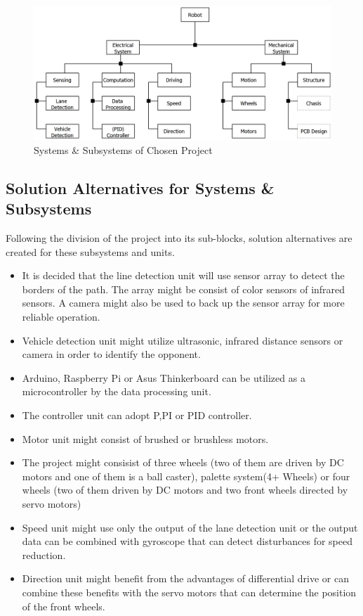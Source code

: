 \documentclass[a4paper,12pt]{article}
\begin{document}
	
	\begin{figure}[H]
		\centering
		\includegraphics[width=\textwidth,height=\textheight,keepaspectratio]{product-tree/product-tree} 
		\caption{\label{fig:systems_project}Systems \& Subsystems of Chosen Project}
	\end{figure}

	\subsection{Solution Alternatives for Systems \& Subsystems }
	
	Following the division of the project into its sub-blocks, solution alternatives are created for these subsystems and units. 
		
	\begin{itemize}
		\item It is decided that the line detection unit will use sensor array to detect the borders of the path. The array might be consist of color sensors of infrared sensors. A camera might also be used to back up the sensor array for more reliable operation.	
		\item Vehicle detection unit might utilize ultrasonic, infrared distance sensors or camera in order to identify the opponent.
		\item  Arduino, Raspberry Pi or Asus Thinkerboard can be utilized as a microcontroller by the data processing unit.
		\item The controller unit can adopt P,PI or PID controller.
		\item Motor unit might consist of brushed or brushless motors.
		\item The project might consisist of three wheels (two of them are driven by DC motors and one of them is a ball caster), palette system(4+ Wheels) or four wheels (two of them driven by DC motors and two front wheels directed by servo motors)
		\item Speed unit might use only the output of the lane detection unit or the output data can be combined with gyroscope that can detect disturbances for speed reduction.  
		\item Direction unit might benefit from the advantages of differential drive or can combine these benefits with the servo motors that can determine the position of the front wheels.
	\end{itemize}	  
			
\end{document}
